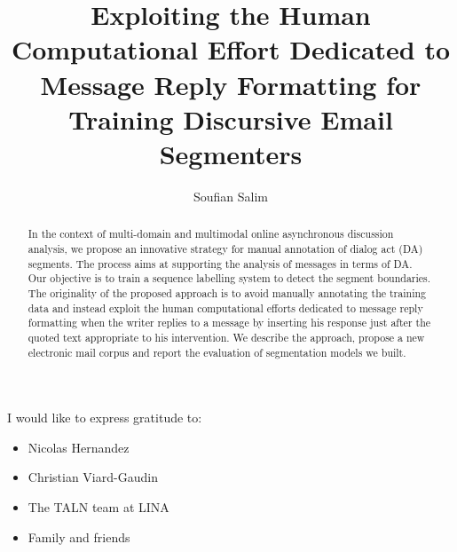 \documentclass[a4paper,12pt,twoside]{report}
\begin{document}
\title{\LARGE {\bf Exploiting the Human Computational Effort Dedicated to Message Reply Formatting for Training Discursive Email Segmenters}\\
 \vspace*{6mm}
}

\author{Soufian Salim}

\normallinespacing
\maketitle

\preface


\begin{abstract}

In the context of multi-domain and multimodal online asynchronous discussion analysis, we propose an innovative strategy for manual annotation of dialog act (DA) segments. The process aims at supporting the analysis of messages in terms of DA. Our objective is to train a sequence labelling system to detect the segment boundaries.  The originality of the proposed approach is to avoid manually annotating the training data and instead exploit the human computational efforts dedicated to message reply formatting  when the writer replies to a message by inserting his response just after the quoted text appropriate to his intervention. We describe the approach, propose a new electronic mail corpus and report the evaluation of segmentation models we built.

\end{abstract}

\cleardoublepage


\begin{acknowledgements}

I would like to express gratitude to:

\begin{itemize}
 \item Nicolas Hernandez
 \vspace*{3mm}
 \item Christian Viard-Gaudin
 \vspace*{3mm}
 \item The TALN team at LINA
 \vspace*{3mm}
 \item Family and friends
\end{itemize}

\end{acknowledgements}
\end{document}
